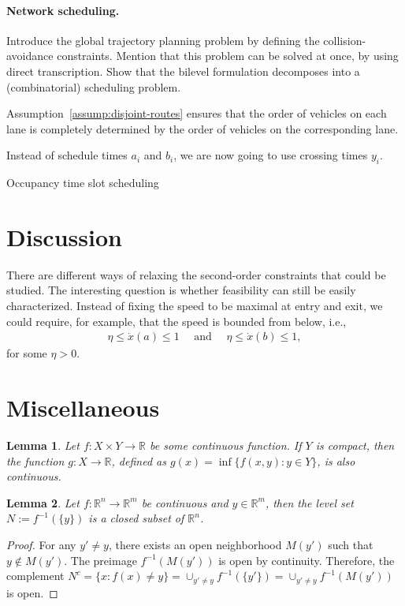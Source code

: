 \documentclass[a4paper]{article}
\theoremstyle{definition}
\theoremstyle{plain}
\newtheorem{lemma}{Lemma\hspace{0.25em}\ignorespaces}
\begin{document}
\paragraph{Network scheduling.}
Introduce the global trajectory planning problem by defining the
collision-avoidance constraints.
Mention that this problem can be solved at once, by using direct transcription.
%
Show that the bilevel formulation decomposes into a (combinatorial) scheduling
problem.

Assumption~\ref{assump:disjoint-routes} ensures that the order of vehicles on
each lane is completely determined by the order of vehicles on the corresponding
lane.

Instead of schedule times $a_{i}$ and $b_{i}$, we are now going to use crossing
times $y_{i}$.

{\color{Navy} Occupancy time slot scheduling}


\section{Discussion}

There are different ways of relaxing the second-order constraints that could be
studied.
%
The interesting question is whether feasibility can still be easily characterized.
%
Instead of fixing the speed to be maximal at entry and exit, we could
require, for example, that the speed is bounded from below, i.e.,
\begin{align}
  \label{eq:1}
  \eta \leq \dot{x}(a) \leq 1 \quad \text{ and } \quad \eta \leq \dot{x}(b) \leq 1 ,
\end{align}
for some $\eta > 0$.

\newpage
\appendix
\section{Miscellaneous}

\begin{lemma}\label{lemma:inf-continuous}
  Let $f : X \times Y \rightarrow \mathbb{R}$ be some continuous function. If
  $Y$ is compact, then the function $g : X \rightarrow \mathbb{R}$, defined as
  $g(x) = \inf \{ f(x,y) : y\in Y\}$, is also continuous.
\end{lemma}

\begin{lemma}\label{lemma:levelset}
  Let $f :\mathbb{R}^{n} \rightarrow \mathbb{R}^{m}$ be continuous and
  $y \in \mathbb{R}^{m}$, then the level set $N := f^{-1}(\{ y \})$ is a closed
  subset of $\mathbb{R}^{n}$.
\end{lemma}
\begin{proof}
  For any $y' \neq y$, there exists an open neighborhood $M(y')$ such that
  $y \notin M(y')$. The preimage $f^{-1}(M(y'))$ is open by continuity.
  Therefore, the complement
  $N^{c} = \{ x : f(x) \neq y \} = \cup_{y' \neq y} f^{-1}(\{y'\}) = \cup_{y' \neq y} f^{-1}(M(y'))$
  is open.
\end{proof}
\end{document}
